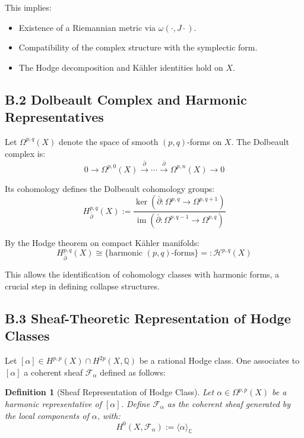 \documentclass[11pt]{article}
\newtheorem{definition}[theorem]{Definition}
\begin{document}
This implies:

\begin{itemize}
  \item Existence of a Riemannian metric via $\omega(\cdot, J\cdot)$.
  \item Compatibility of the complex structure with the symplectic form.
  \item The Hodge decomposition and Kähler identities hold on $X$.
\end{itemize}

\subsection*{B.2 Dolbeault Complex and Harmonic Representatives}

Let $\Omega^{p,q}(X)$ denote the space of smooth $(p,q)$-forms on $X$. The Dolbeault complex is:
\[
0 \to \Omega^{p,0}(X) \xrightarrow{\bar{\partial}} \cdots \xrightarrow{\bar{\partial}} \Omega^{p,n}(X) \to 0
\]

Its cohomology defines the Dolbeault cohomology groups:
\[
H^{p,q}_{\bar{\partial}}(X) := \frac{\ker(\bar{\partial} : \Omega^{p,q} \to \Omega^{p,q+1})}{\operatorname{im}(\bar{\partial} : \Omega^{p,q-1} \to \Omega^{p,q})}
\]

By the Hodge theorem on compact Kähler manifolds:
\[
H^{p,q}_{\bar{\partial}}(X) \cong \{ \text{harmonic } (p,q)\text{-forms} \} =: \mathcal{H}^{p,q}(X)
\]

This allows the identification of cohomology classes with harmonic forms, a crucial step in defining collapse structures.

\subsection*{B.3 Sheaf-Theoretic Representation of Hodge Classes}

Let $[\alpha] \in H^{p,p}(X) \cap H^{2p}(X, \mathbb{Q})$ be a rational Hodge class. One associates to $[\alpha]$ a coherent sheaf $\mathcal{F}_\alpha$ defined as follows:

\begin{definition}[Sheaf Representation of Hodge Class]
Let $\alpha \in \Omega^{p,p}(X)$ be a harmonic representative of $[\alpha]$. Define $\mathcal{F}_\alpha$ as the coherent sheaf generated by the local components of $\alpha$, with:
\[
H^0(X, \mathcal{F}_\alpha) := \langle \alpha \rangle_{\mathbb{C}}
\]
\end{definition}
\end{document}
